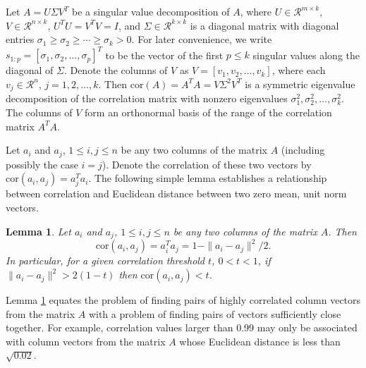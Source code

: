 \documentclass{article}
\newtheorem{lemma}[theorem]{Lemma}
\newenvironment{proof}[1][Proof]{\begin{trivlist}
\item[\hskip \labelsep {\bfseries #1}]}{\end{trivlist}}
\numberwithin{algorithmctr}{section}
\begin{document}
Let $A=U\Sigma V^T$ be a singular value decomposition of $A$, where
$U\in\mathcal{R}^{m\times k}$, $V\in\mathcal{R}^{n\times k}$,
$U^TU = V^TV = I$,
and $\Sigma\in\mathcal{R}^{k\times k}$ is a diagonal matrix with
diagonal entries $\sigma_1 \ge \sigma_2 \ge \cdots \ge \sigma_k > 0$.  For
later convenience, we write $s_{1:p}=[\sigma_1, \sigma_2, \ldots, \sigma_p]^T$
to be the vector of the first $p\le k$ singular values along the diagonal of
$\Sigma$.  Denote the columns of $V$ as $V=[v_1, v_2, \ldots, v_k]$, where each
$v_j\in\mathcal{R}^n$, $j=1,2,\ldots,k$.  Then $\mathrm{cor}(A) = A^TA =
V\Sigma^2 V^T$ is a symmetric eigenvalue decomposition of the correlation
matrix with nonzero eigenvalues $\sigma_1^2, \sigma_2^2, \ldots, \sigma_k^2$.
The columns of $V$ form an orthonormal basis of the range of the
correlation matrix $A^TA$.

Let $a_i$ and $a_j$, $1\le i,j\le n$ be any two columns of the matrix $A$
(including possibly the case $i=j$). Denote the correlation of these two
vectors by $\mathrm{cor}(a_i,a_j) = a_j^T a_i$.  The following simple lemma
establishes a relationship between correlation and Euclidean distance between
two zero mean, unit norm vectors.

\begin{lemma}
\label{distlemma}
Let $a_i$ and $a_j$, $1\le i,j\le n$ be any two columns of the matrix
$A$. Then
\begin{equation}\label{cordist}
\mathrm{cor}(a_i,a_j) = a_i^Ta_j = 1 - \|a_i - a_j\|^2/2.
\end{equation}
In particular, for a given correlation threshold $t$, $0<t<1$, if
$\|a_i - a_j\|^2 > 2(1-t)$ then
$\mathrm{cor}(a_i, a_j) < t$.
\end{lemma}

Lemma \ref{distlemma} equates the problem of finding pairs of highly correlated
column vectors from the matrix $A$ with a problem of finding pairs of vectors
sufficiently close together. For example, correlation values larger than 0.99
may only be associated with column vectors from the matrix $A$ whose Euclidean
distance is less than $\sqrt{0.02}$.
\end{document}
